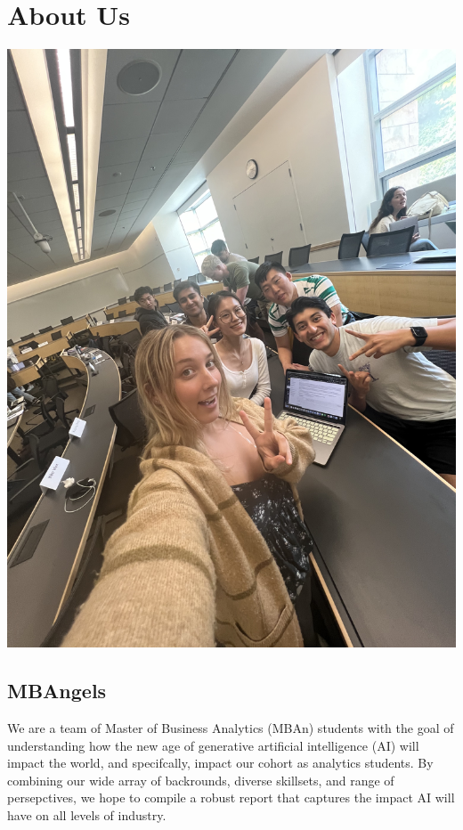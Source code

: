 \documentclass[
]{book}
\begin{document}
\hypertarget{about-us}{%
\chapter{About Us}\label{about-us}}

\includegraphics{images/MBAngels.jpg}

\hypertarget{mbangels}{%
\section{MBAngels}\label{mbangels}}

We are a team of Master of Business Analytics (MBAn) students with the goal of understanding how the new age of generative artificial intelligence (AI) will impact the world, and specifcally, impact our cohort as analytics students. By combining our wide array of backrounds, diverse skillsets, and range of persepctives, we hope to compile a robust report that captures the impact AI will have on all levels of industry.
\end{document}
